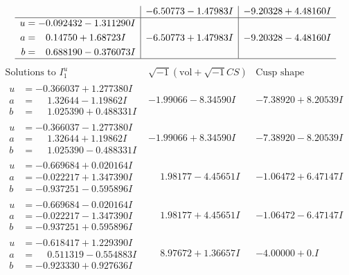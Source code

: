 \documentclass[1p]{elsarticle_modified}
\theoremstyle{definition}
\newcommand{\I}{\sqrt{-1}}
\begin{document}
$$\begin{array}{c|c|c}
 & -6.50773 - 1.47983 I & -9.20328 + 4.48160 I \\ \hline\begin{aligned}
u &= -0.092432 - 1.311290 I \\
a &= \phantom{-}0.14750 + 1.68723 I \\
b &= \phantom{-}0.688190 - 0.376073 I\end{aligned}
 & -6.50773 + 1.47983 I & -9.20328 - 4.48160 I\\
 \hline 
 \end{array}$$\newpage$$\begin{array}{c|c|c}  
\text{Solutions to }I^u_{1}& \I (\text{vol} + \sqrt{-1}CS) & \text{Cusp shape}\\
 \hline 
\begin{aligned}
u &= -0.366037 + 1.277380 I \\
a &= \phantom{-}1.32644 - 1.19862 I \\
b &= \phantom{-}1.025390 + 0.488331 I\end{aligned}
 & -1.99066 - 8.34590 I & -7.38920 + 8.20539 I \\ \hline\begin{aligned}
u &= -0.366037 - 1.277380 I \\
a &= \phantom{-}1.32644 + 1.19862 I \\
b &= \phantom{-}1.025390 - 0.488331 I\end{aligned}
 & -1.99066 + 8.34590 I & -7.38920 - 8.20539 I \\ \hline\begin{aligned}
u &= -0.669684 + 0.020164 I \\
a &= -0.022217 + 1.347390 I \\
b &= -0.937251 - 0.595896 I\end{aligned}
 & \phantom{-}1.98177 - 4.45651 I & -1.06472 + 6.47147 I \\ \hline\begin{aligned}
u &= -0.669684 - 0.020164 I \\
a &= -0.022217 - 1.347390 I \\
b &= -0.937251 + 0.595896 I\end{aligned}
 & \phantom{-}1.98177 + 4.45651 I & -1.06472 - 6.47147 I \\ \hline\begin{aligned}
u &= -0.618417 + 1.229390 I \\
a &= \phantom{-}0.511319 - 0.554883 I \\
b &= -0.923330 + 0.927636 I\end{aligned}
 & \phantom{-}8.97672 + 1.36657 I & -4.00000 + 0. I\phantom{ +0.000000I} \\ \hline\begin{aligned}

\end{aligned}
\end{array}$$
\end{document}
